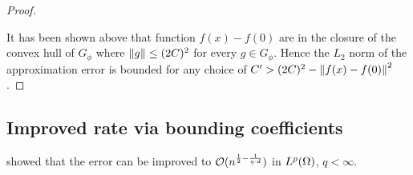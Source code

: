 \begin{proof}
\begin{lemma}
    \end{lemma}


    It has been shown above that function $f(x) - f(0)$ are in the closure of
    the convex hull of $G_{\phi}$ where $\left\| g \right\| \leq (2C)^2$ for every $g \in
    G_{\phi}$. Hence the $L_2$ norm of the approximation error is bounded for
    any choice of $C' > (2C)^2 - \left\| f(x) - f(0) \right\|^2$.




\end{proof}



\subsection{Improved rate via bounding coefficients}
\label{subsec:improved_heaviside}


\cite{makovozRandomApproximantsNeural1996} showed that the error can be improved
to $\mathcal{O}(n^{\frac{1}{2} - \frac{1}{q\cdot d}})$ in $L^{p}(\Omega)$, $q <
\infty$.

